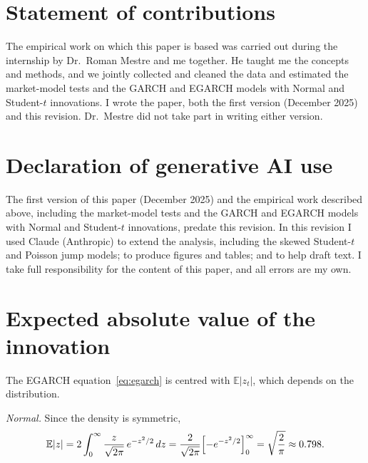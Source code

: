 \documentclass[11pt,a4paper]{article}
\newcommand{\E}{\mathbb{E}}
\begin{document}
\section*{Statement of contributions}
{\small The empirical work on which this paper is based was carried out during the internship by Dr.\ Roman Mestre and me together. He taught me the concepts and methods, and we jointly collected and cleaned the data and estimated the market-model tests and the GARCH and EGARCH models with Normal and Student-$t$ innovations. I wrote the paper, both the first version (December 2025) and this revision. Dr.\ Mestre did not take part in writing either version.\par}

\section*{Declaration of generative AI use}
{\small The first version of this paper (December 2025) and the empirical work described above, including the market-model tests and the GARCH and EGARCH models with Normal and Student-$t$ innovations, predate this revision. In this revision I used Claude (Anthropic) to extend the analysis, including the skewed Student-$t$ and Poisson jump models; to produce figures and tables; and to help draft text. I take full responsibility for the content of this paper, and all errors are my own.\par}

\clearpage
{}
\appendix
{}

\section{Expected absolute value of the innovation}\label{app:absz}

The EGARCH equation~\eqref{eq:egarch} is centred with $\E|z_t|$, which depends on the distribution.

\emph{Normal.} Since the density is symmetric,
\begin{equation}
\E|z|=2\int_{0}^{\infty}\frac{z}{\sqrt{2\pi}}\,e^{-z^{2}/2}\,dz=\frac{2}{\sqrt{2\pi}}\Bigl[-e^{-z^{2}/2}\Bigr]_{0}^{\infty}=\sqrt{\frac{2}{\pi}}\approx 0.798 .
\end{equation}
\end{document}
